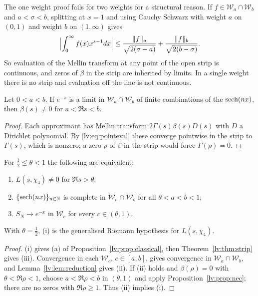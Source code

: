 The one weight proof fails for two weights for a structural reason. If $f\in\mathcal W_a\cap\mathcal W_b$ and $a<\sigma<b$, splitting at $x=1$ and using Cauchy Schwarz with weight $a$ on $(0,1)$ and weight $b$ on $(1,\infty)$ gives
\begin{equation}\label{lv:eq:pointeval}
\Bigl|\int_0^\infty f(x)x^{s-1}dx\Bigr|\le\frac{\|f\|_a}{\sqrt{2(\sigma-a)}}+\frac{\|f\|_b}{\sqrt{2(b-\sigma)}} .
\end{equation}
So evaluation of the Mellin transform at any point of the open strip is continuous, and zeros of $\beta$ in the strip are inherited by limits. In a single weight there is no strip and evaluation off the line is not continuous.

\begin{proposition}[necessity]\label{lv:prop:nec}
Let $0<a<b$. If $e^{-x}$ is a limit in $\mathcal W_a\cap\mathcal W_b$ of finite combinations of the $\operatorname{sech}(nx)$, then $\beta(s)\ne0$ for $a<\Re s<b$.
\end{proposition}

\begin{proof}
Each approximant has Mellin transform $2\Gamma(s)\beta(s)D(s)$ with $D$ a Dirichlet polynomial. By \eqref{lv:eq:pointeval} these converge pointwise in the strip to $\Gamma(s)$, which is nonzero; a zero $\rho$ of $\beta$ in the strip would force $\Gamma(\rho)=0$.
\end{proof}

\begin{theorem}\label{lv:thm:two}
For $\frac12\le\theta<1$ the following are equivalent:
\begin{enumerate}
\item[(i)] $L(s,\chi_4)\ne0$ for $\Re s>\theta$;
\item[(ii)] $\{\operatorname{sech}(nx)\}_{n\in\mathbb N}$ is complete in $\mathcal W_a\cap\mathcal W_b$ for all $\theta<a<b<1$;
\item[(iii)] $S_N\to e^{-x}$ in $\mathcal W_c$ for every $c\in(\theta,1)$.
\end{enumerate}
With $\theta=\frac12$, (i) is the generalised Riemann hypothesis for $L(s,\chi_4)$.
\end{theorem}

\begin{proof}
(i) gives (a) of Proposition~\ref{lv:prop:classical}, then Theorem~\ref{lv:thm:strip} gives (iii). Convergence in each $\mathcal W_c$, $c\in[a,b]$, gives convergence in $\mathcal W_a\cap\mathcal W_b$, and Lemma~\ref{lv:lem:reduction} gives (ii). If (ii) holds and $\beta(\rho)=0$ with $\theta<\Re\rho<1$, choose $a<\Re\rho<b$ in $(\theta,1)$ and apply Proposition~\ref{lv:prop:nec}; there are no zeros with $\Re\rho\ge1$. Thus (ii) implies (i).
\end{proof}

